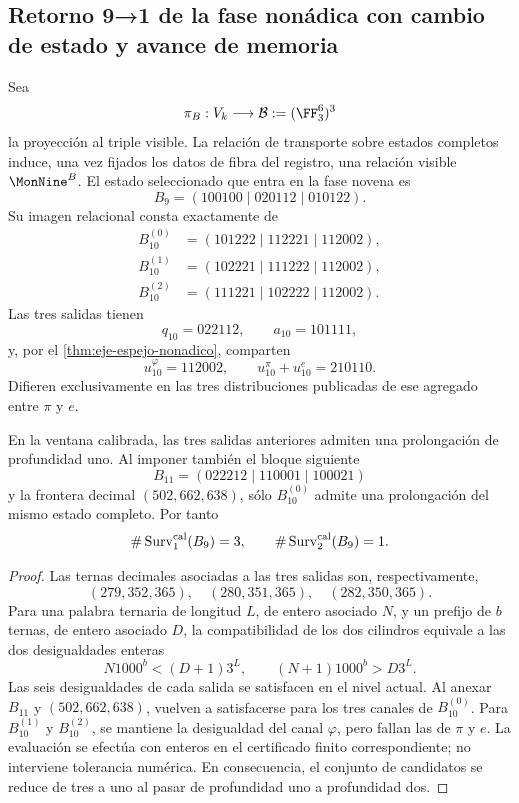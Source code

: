 \subsection{Retorno 9→1 de la fase nonádica con cambio de estado y avance de memoria}

Sea
\[
 \pi_B:V_k\longrightarrow\mathcal B:=(\FF_3^6)^3
\]
la proyección al triple visible. La relación de transporte sobre estados
completos induce, una vez fijados los datos de fibra del registro, una relación
visible \(\MonNine^B\). El estado seleccionado que entra en la fase novena es
\[
B_9=(100100\mid020112\mid010122).
\]
Su imagen relacional consta exactamente de
\[
\begin{aligned}
B_{10}^{(0)}&=(101222\mid112221\mid112002),\\
B_{10}^{(1)}&=(102221\mid111222\mid112002),\\
B_{10}^{(2)}&=(111221\mid102222\mid112002).
\end{aligned}
\]
Las tres salidas tienen
\[
q_{10}=022112,
\qquad a_{10}=101111,
\]
y, por el \cref{thm:eje-espejo-nonadico}, comparten
\[
u_{10}^\varphi=112002,
\qquad u_{10}^\pi+u_{10}^e=210110.
\]
Difieren exclusivamente en las tres distribuciones publicadas de ese agregado
entre \(\pi\) y \(e\).

\begin{theorem}
\label{thm:seleccion-novena-fase}
En la ventana calibrada, las tres salidas anteriores admiten una prolongación
de profundidad uno. Al imponer también el bloque siguiente
\[
B_{11}=(022212\mid110001\mid100021)
\]
y la frontera decimal \((502,662,638)\), sólo
\(B_{10}^{(0)}\) admite una prolongación del mismo estado completo. Por tanto
\[
\#\operatorname{Surv}^{\rm cal}_{1}(B_9)=3,
\qquad
\#\operatorname{Surv}^{\rm cal}_{2}(B_9)=1.
\]
\end{theorem}

\begin{proof}
Las ternas decimales asociadas a las tres salidas son, respectivamente,
\[
(279,352,365),\quad(280,351,365),\quad(282,350,365).
\]
Para una palabra ternaria de longitud \(L\), de entero asociado \(N\), y un
prefijo de \(b\) ternas, de entero asociado \(D\), la compatibilidad de los
dos cilindros equivale a las dos desigualdades enteras
\[
N1000^b<(D+1)3^L,
\qquad
(N+1)1000^b>D3^L.
\]
Las seis desigualdades de cada salida se satisfacen en el nivel actual. Al
anexar \(B_{11}\) y \((502,662,638)\), vuelven a satisfacerse para los tres
canales de \(B_{10}^{(0)}\). Para \(B_{10}^{(1)}\) y \(B_{10}^{(2)}\), se
mantiene la desigualdad del canal \(\varphi\), pero fallan las de \(\pi\) y
\(e\). La evaluación se efectúa con enteros en el certificado finito correspondiente; no
interviene tolerancia numérica. En consecuencia, el conjunto de candidatos
se reduce de tres a uno al pasar de profundidad uno a profundidad dos.
\end{proof}

